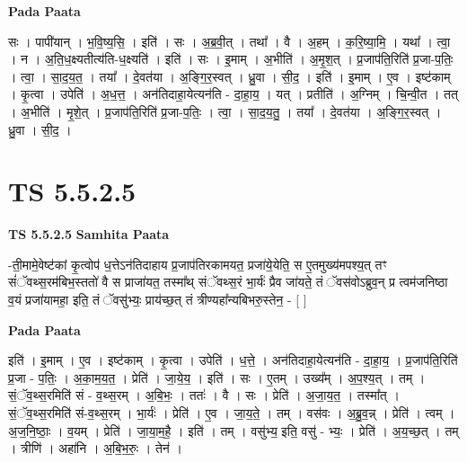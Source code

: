 \documentclass[17pt]{extarticle}
\begin{document}
\textbf{Pada Paata} \newline

सः । पापी॑यान् । भ॒वि॒ष्य॒सि॒ । इति॑ । सः । अ॒ब्र॒वी॒त् । तथा᳚ । वै । अ॒हम् । क॒रि॒ष्या॒मि॒ । यथा᳚ । त्वा॒ । न । अ॒ति॒ध॒क्ष्यतीत्य॑ति-ध॒क्ष्यति॑ । इति॑ । सः । इ॒माम् । अ॒भीति॑ । अ॒मृ॒श॒त् । प्र॒जाप॑ति॒रिति॑ प्र॒जा-प॒तिः॒ । त्वा॒ । सा॒द॒य॒त॒ । तया᳚ । दे॒वत॑या । अ॒ङ्गि॒र॒स्वत् । ध्रु॒वा । सी॒द॒ । इति॑ । इ॒माम् । ए॒व । इष्ट॑काम् । कृ॒त्वा । उपेति॑ । अ॒ध॒त्त॒ । अन॑तिदाहा॒येत्यन॑ति - दा॒हा॒य॒ । यत् । प्रतीति॑ । अ॒ग्निम् । चि॒न्वी॒त । तत् । अ॒भीति॑ । मृ॒शे॒त् । प्र॒जाप॑ति॒रिति॑ प्र॒जा-प॒तिः॒ । त्वा॒ । सा॒द॒य॒तु॒ । तया᳚ । दे॒वत॑या । अ॒ङ्गि॒र॒स्वत् । ध्रु॒वा । सी॒द॒ ।  \newline





\section{ TS 5.5.2.5 }

\textbf{TS 5.5.2.5 } \newline
\textbf{Samhita Paata} \newline

-ती॒मामे॒वेष्ट॑कां कृ॒त्वोप॑ ध॒त्तेऽन॑तिदाहाय प्र॒जाप॑तिरकामयत॒ प्रजा॑ये॒येति॒ स ए॒तमुख्य॑मपश्य॒त् तꣳ सं॑ॅवथ्स॒रम॑बिभ॒स्ततो॑ वै स प्राजा॑यत॒ तस्मा᳚थ् संॅवथ्स॒रं भा॒र्यः॑ प्रैव जा॑यते॒ तं ॅवस॑वोऽब्रुव॒न् प्र त्वम॑जनिष्ठा व॒यं प्रजा॑यामहा॒ इति॒ तं ॅवसु॑भ्यः॒ प्राय॑च्छ॒त् तं त्रीण्यहा᳚न्यबिभरु॒स्तेन॒ - [  ] \newline

\textbf{Pada Paata} \newline

इति॑ । इ॒माम् । ए॒व । इष्ट॑काम् । कृ॒त्वा । उपेति॑ । ध॒त्ते॒ । अन॑तिदाहा॒येत्यन॑ति - दा॒हा॒य॒ । प्र॒जाप॑ति॒रिति॑ प्र॒जा - प॒तिः॒ । अ॒का॒म॒य॒त॒ । प्रेति॑ । जा॒ये॒य॒ । इति॑ । सः । ए॒तम् । उख्य᳚म् । अ॒प॒श्य॒त् । तम् । सं॒ॅव॒थ्स॒रमिति॑ सं - व॒थ्स॒रम् । अ॒बि॒भः॒ । ततः॑ । वै । सः । प्रेति॑ । अ॒जा॒य॒त॒ । तस्मा᳚त् । सं॒ॅव॒थ्स॒रमिति॑ सं-व॒थ्स॒रम् । भा॒र्यः॑ । प्रेति॑ । ए॒व । जा॒य॒ते॒ । तम् । वस॑वः । अ॒ब्रु॒व॒न्न् । प्रेति॑ । त्वम् । अ॒ज॒नि॒ष्ठाः॒ । व॒यम् । प्रेति॑ । जा॒या॒म॒है॒ । इति॑ । तम् । वसु॑भ्य॒ इति॒ वसु॑ - भ्यः॒ । प्रेति॑ । अ॒य॒च्छ॒त् । तम् । त्रीणि॑ । अहा॑नि । अ॒बि॒भ॒रुः॒ । तेन॑ ।  \newline




\end{document}

